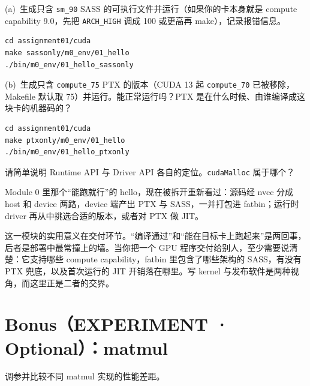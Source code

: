 \documentclass[11pt,a4paper,fontset=none]{ctexart}
\begin{document}
(a)~生成只含 \texttt{sm\_90} SASS 的可执行文件并运行（如果你的卡本身就是 compute capability 9.0，先把 \texttt{ARCH\_HIGH} 调成 100 或更高再 make），记录报错信息。

\begin{lstlisting}
cd assignment01/cuda
make sassonly/m0_env/01_hello
./bin/m0_env/01_hello_sassonly
\end{lstlisting}

(b)~生成只含 \texttt{compute\_75} PTX 的版本（CUDA 13 起 \texttt{compute\_70} 已被移除，Makefile 默认取 75）并运行。能正常运行吗？PTX 是在什么时候、由谁编译成这块卡的机器码的？

\begin{lstlisting}
cd assignment01/cuda
make ptxonly/m0_env/01_hello
./bin/m0_env/01_hello_ptxonly
\end{lstlisting}

请简单说明 Runtime API 与 Driver API 各自的定位。\texttt{cudaMalloc} 属于哪个？

\begin{lookback}
Module 0 里那个“能跑就行”的 hello，现在被拆开重新看过：源码经 nvcc 分成 host 和 device 两路，device 端产出 PTX 与 SASS，一并打包进 fatbin；运行时 driver 再从中挑选合适的版本，或者对 PTX 做 JIT。

这一模块的实用意义在交付环节。“编译通过”和“能在目标卡上跑起来”是两回事，后者是部署中最常撞上的墙。当你把一个 GPU 程序交付给别人，至少需要说清楚：它支持哪些 compute capability，fatbin 里包含了哪些架构的 SASS，有没有 PTX 兜底，以及首次运行的 JIT 开销落在哪里。写 kernel 与发布软件是两种视角，而这里正是二者的交界。
\end{lookback}

\clearpage
\section*{Bonus（EXPERIMENT · Optional）：matmul}

调参并比较不同 matmul 实现的性能差距。
\end{document}
